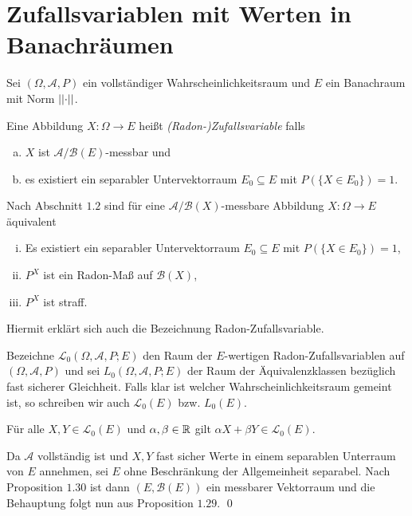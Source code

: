 \section{Zufallsvariablen mit Werten in Banachräumen}
Sei $(\Omega, \mathcal{A}, P)$ ein vollständiger Wahrscheinlichkeitsraum und $E$ ein Banachraum mit Norm $\lvert\lvert \cdot \rvert\rvert$. 
\begin{mydef}
    Eine Abbildung $X: \Omega \to E$ heißt \textit{(Radon-)Zufallsvariable} falls 
    \begin{enumerate}[(a)]
        \item $X$ ist $\mathcal{A}/\mathcal{B}(E)$-messbar und
        \item es existiert ein separabler Untervektorraum $E_0 \subseteq E$ mit $P(\{X \in E_0\}) = 1$. 
    \end{enumerate}
\end{mydef}

\begin{remark}
    Nach Abschnitt $1.2$ sind für eine $\mathcal{A}/\mathcal{B}(X)$-messbare Abbildung $X: \Omega \to E$ äquivalent
    \begin{enumerate}[(i)]
        \item Es existiert ein separabler Untervektorraum $E_0 \subseteq E$ mit $P(\{X \in E_0\}) = 1$,
        \item $P^X$ ist ein Radon-Maß auf $\mathcal{B}(X)$, 
        \item $P^X$ ist straff. 
    \end{enumerate}
    Hiermit erklärt sich auch die Bezeichnung Radon-Zufallsvariable. 
\end{remark}

Bezeichne $\mathcal{L}_0(\Omega, \mathcal{A}, P; E)$ den Raum der $E$-wertigen Radon-Zufallsvariablen auf $(\Omega,\mathcal{A},P)$ und sei $L_0(\Omega, \mathcal{A}, P;E)$ der Raum der Äquivalenzklassen bezüglich fast sicherer Gleichheit. 
Falls klar ist welcher Wahrscheinlichkeitsraum gemeint ist, so schreiben wir auch $\mathcal{L}_0(E)$ bzw. $L_0(E)$. 

\begin{proposition}
   Für alle $X,Y \in \mathcal{L}_0(E)$ und $\alpha, \beta \in \mathbb{R}$ gilt $\alpha X + \beta Y \in \mathcal{L}_0(E)$.
\end{proposition}

\begin{proof*}
    Da $\mathcal{A}$ vollständig ist und $X,Y$ fast sicher Werte in einem separablen Unterraum von $E$ annehmen, sei $E$ ohne Beschränkung der Allgemeinheit separabel. 
    Nach Proposition $1.30$ ist dann $(E, \mathcal{B}(E))$ ein messbarer Vektorraum und die Behauptung folgt nun aus Proposition $1.29$. \qed 
\end{proof*}

